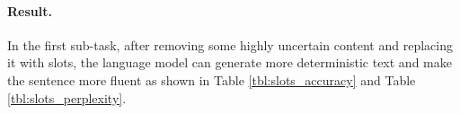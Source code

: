 \documentclass{article}
\begin{document}
\begin{table}[]
\caption{The perplexity on test dataset. }
\label{tbl:slots_perplexity}
\end{table}



\paragraph{Result.} 
In the first sub-task, after removing some highly uncertain content and replacing it with slots, the language model can generate more deterministic text and make the sentence more fluent as shown in Table \ref{tbl:slots_accuracy} and Table \ref{tbl:slots_perplexity}.
\end{document}
